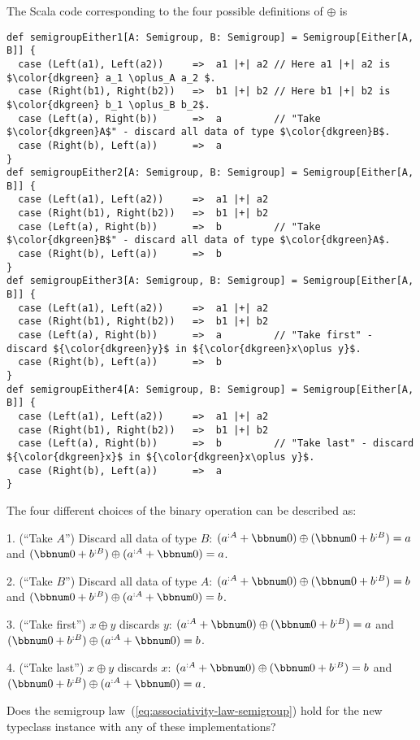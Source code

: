 The Scala code corresponding to the four possible definitions of $\oplus$
is
\begin{lstlisting}[mathescape=true]
def semigroupEither1[A: Semigroup, B: Semigroup] = Semigroup[Either[A, B]] {
  case (Left(a1), Left(a2))     =>  a1 |+| a2 // Here a1 |+| a2 is $\color{dkgreen} a_1 \oplus_A a_2 $.
  case (Right(b1), Right(b2))   =>  b1 |+| b2 // Here b1 |+| b2 is $\color{dkgreen} b_1 \oplus_B b_2$.
  case (Left(a), Right(b))      =>  a         // "Take $\color{dkgreen}A$" - discard all data of type $\color{dkgreen}B$.
  case (Right(b), Left(a))      =>  a
}
def semigroupEither2[A: Semigroup, B: Semigroup] = Semigroup[Either[A, B]] {
  case (Left(a1), Left(a2))     =>  a1 |+| a2
  case (Right(b1), Right(b2))   =>  b1 |+| b2
  case (Left(a), Right(b))      =>  b         // "Take $\color{dkgreen}B$" - discard all data of type $\color{dkgreen}A$.
  case (Right(b), Left(a))      =>  b
}
def semigroupEither3[A: Semigroup, B: Semigroup] = Semigroup[Either[A, B]] {
  case (Left(a1), Left(a2))     =>  a1 |+| a2
  case (Right(b1), Right(b2))   =>  b1 |+| b2
  case (Left(a), Right(b))      =>  a         // "Take first" - discard ${\color{dkgreen}y}$ in ${\color{dkgreen}x\oplus y}$.
  case (Right(b), Left(a))      =>  b
}
def semigroupEither4[A: Semigroup, B: Semigroup] = Semigroup[Either[A, B]] {
  case (Left(a1), Left(a2))     =>  a1 |+| a2
  case (Right(b1), Right(b2))   =>  b1 |+| b2
  case (Left(a), Right(b))      =>  b         // "Take last" - discard ${\color{dkgreen}x}$ in ${\color{dkgreen}x\oplus y}$.
  case (Right(b), Left(a))      =>  a
}
\end{lstlisting}
The four different choices of the binary operation can be described
as:

1. (\textsf{``}Take $A$\textsf{''}) Discard all data of type $B$: $(a^{:A}+\bbnum 0)\oplus(\bbnum 0+b^{:B})=a$
and $(\bbnum 0+b^{:B})\oplus(a^{:A}+\bbnum 0)=a$.

2. (\textsf{``}Take $B$\textsf{''}) Discard all data of type $A$: $(a^{:A}+\bbnum 0)\oplus(\bbnum 0+b^{:B})=b$
and $(\bbnum 0+b^{:B})\oplus(a^{:A}+\bbnum 0)=b$.

3. (\textsf{``}Take first\textsf{''}) $x\oplus y$ discards $y$: $(a^{:A}+\bbnum 0)\oplus(\bbnum 0+b^{:B})=a$
and $(\bbnum 0+b^{:B})\oplus(a^{:A}+\bbnum 0)=b$.

4. (\textsf{``}Take last\textsf{''}) $x\oplus y$ discards $x$: $(a^{:A}+\bbnum 0)\oplus(\bbnum 0+b^{:B})=b$
and $(\bbnum 0+b^{:B})\oplus(a^{:A}+\bbnum 0)=a$.

\noindent Does the semigroup law~(\ref{eq:associativity-law-semigroup})
hold for the new typeclass instance with any of these implementations?

